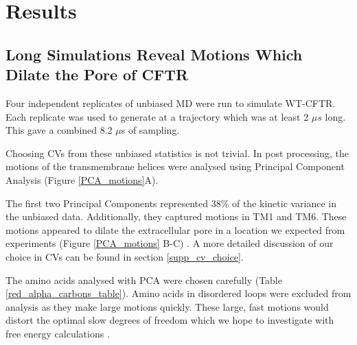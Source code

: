 \section{Results}

\subsection{Long Simulations Reveal Motions Which Dilate the Pore of CFTR}
Four independent replicates of unbiased MD were run to simulate WT-CFTR. Each replicate was used to generate at a trajectory which was at least 2 $\mu s$ long. This gave a combined 8.2 $\mu$s of sampling. 

Choosing CVs from these unbiased statistics is not trivial. In post processing, the motions of the transmembrane helices were analysed using Principal Component Analysis \cite{pearson1901, hotelling1936} (Figure \ref{PCA_motions}A). 

The first two Principal Components represented 38\% of the kinetic variance in the unbiased data. Additionally, they captured motions in TM1 and TM6. These motions appeared to dilate the extracellular pore in a location we expected from experiments (Figure \ref{PCA_motions} B-C) \cite{linsdell2018, negoda2018, negoda2019}. A more detailed discussion of our choice in CVs can be found in section \ref{supp_cv_choice}. 

The amino acids analysed with PCA were chosen carefully (Table \ref{red_alpha_carbons_table}). Amino acids in disordered loops were excluded from analysis as they make large motions quickly. These large, fast motions would distort the optimal slow degrees of freedom which we hope to investigate with free energy calculations \cite{noe2001}. 

